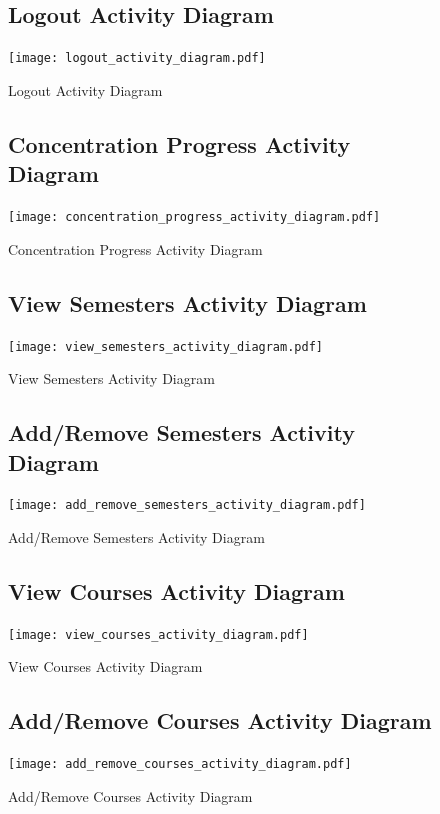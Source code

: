 \documentclass[12pt]{article}
\begin{document}
\begin{figure}[p!]
  \subsection{Logout Activity Diagram}
  \centering
  \texttt{[image: logout\_activity\_diagram.pdf]}
  \caption{Logout Activity Diagram}
\end{figure}

\begin{figure}[p!]
  \subsection{Concentration Progress Activity Diagram}
  \centering
  \texttt{[image: concentration\_progress\_activity\_diagram.pdf]}
  \caption{Concentration Progress Activity Diagram}
\end{figure}

\begin{figure}[p!]
  \subsection{View Semesters Activity Diagram}
  \centering
  \texttt{[image: view\_semesters\_activity\_diagram.pdf]}
  \caption{View Semesters Activity Diagram}
\end{figure}

\begin{figure}[p!]
  \subsection{Add/Remove Semesters Activity Diagram}
  \centering
  \texttt{[image: add\_remove\_semesters\_activity\_diagram.pdf]}
  \caption{Add/Remove Semesters Activity Diagram}
\end{figure}

\begin{figure}[p!]
  \subsection{View Courses Activity Diagram}
  \centering
  \texttt{[image: view\_courses\_activity\_diagram.pdf]}
  \caption{View Courses Activity Diagram}
\end{figure}

\begin{figure}[p!]
  \subsection{Add/Remove Courses Activity Diagram}
  \centering
  \texttt{[image: add\_remove\_courses\_activity\_diagram.pdf]}
  \caption{Add/Remove Courses Activity Diagram}
\end{figure}
\end{document}
